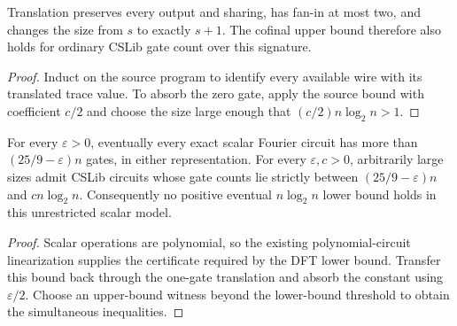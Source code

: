 \begin{theorem}
  \label{thm:circuits-exact-fourier-cslib}
  \leanok
  Translation preserves every output and sharing, has fan-in at most two,
  and changes the size from $s$ to exactly $s+1$. The cofinal upper bound
  therefore also holds for ordinary CSLib gate count over this signature.
\end{theorem}
\begin{proof}
  \leanok
  Induct on the source program to identify every available wire with its
  translated trace value. To absorb the zero gate, apply the source bound
  with coefficient $c/2$ and choose the size large enough that
  $(c/2)n\log_2n>1$.
\end{proof}

\begin{corollary}
  \label{cor:circuits-exact-fourier-bounds}
  \leanok
  For every $\varepsilon>0$, eventually every exact scalar Fourier circuit
  has more than $(25/9-\varepsilon)n$ gates, in either representation.
  For every $\varepsilon,c>0$, arbitrarily large sizes admit CSLib circuits
  whose gate counts lie strictly between $(25/9-\varepsilon)n$ and
  $cn\log_2n$. Consequently no positive eventual $n\log_2n$ lower bound
  holds in this unrestricted scalar model.
\end{corollary}
\begin{proof}
  \leanok
  Scalar operations are polynomial, so the existing polynomial-circuit
  linearization supplies the certificate required by the DFT lower bound.
  Transfer this bound back through the one-gate translation and absorb the
  constant using $\varepsilon/2$. Choose an upper-bound witness beyond the
  lower-bound threshold to obtain the simultaneous inequalities.
\end{proof}
